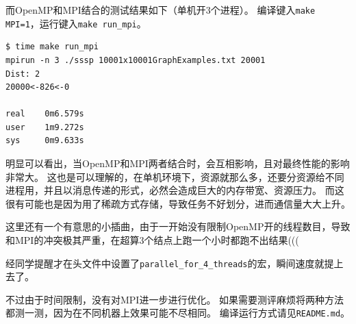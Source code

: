 \documentclass[reportComp]{thesis}
\begin{document}



而OpenMP和MPI结合的测试结果如下（单机开3个进程）。
编译键入\verb'make MPI=1'，运行键入\verb'make run_mpi'。
\begin{lstlisting}
$ time make run_mpi
mpirun -n 3 ./sssp 10001x10001GraphExamples.txt 20001
Dist: 2
20000<-826<-0

real    0m6.579s
user    1m9.272s
sys     0m9.633s
\end{lstlisting}


明显可以看出，当OpenMP和MPI两者结合时，会互相影响，且对最终性能的影响非常大。
这也是可以理解的，在单机环境下，资源就那么多，还要分资源给不同进程用，并且以消息传递的形式，必然会造成巨大的内存带宽、资源压力。
而这很有可能也是因为用了稀疏方式存储，导致任务不好划分，进而通信量大大上升。

这里还有一个有意思的小插曲，由于一开始没有限制OpenMP开的线程数目，导致和MPI的冲突极其严重，在超算3个结点上跑一个小时都跑不出结果(((

经同学提醒才在头文件中设置了\verb'parallel_for_4_threads'的宏，瞬间速度就提上去了。

不过由于时间限制，没有对MPI进一步进行优化。
如果需要测评麻烦将两种方法都测一测，因为在不同机器上效果可能不尽相同。
编译运行方式请见\verb'README.md'。
\end{document}
